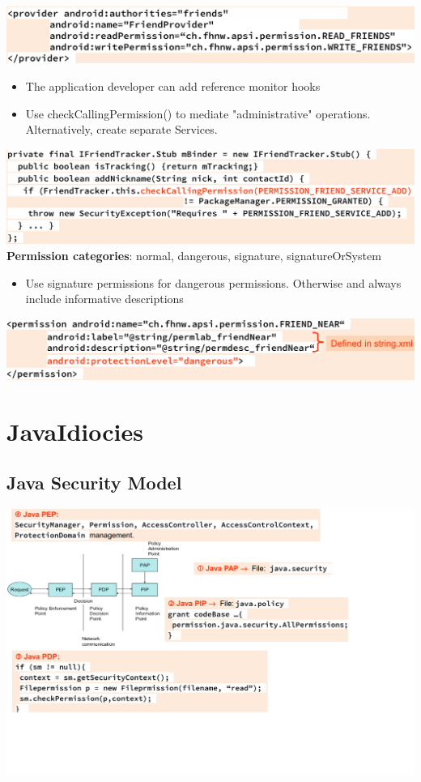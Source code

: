 \documentclass[10pt]{article}
\begin{document}
\includegraphics[scale=0.4]{content_prov_perm.png}
\begin{itemize}
	\item The application developer can add reference monitor hooks
	\item Use checkCallingPermission() to mediate "administrative" operations. Alternatively, create separate Services.
\end{itemize}
\includegraphics[scale=0.4]{service_hooks.png}
\textbf{Permission categories}: normal, dangerous, signature, signatureOrSystem
\begin{itemize}
	\item Use signature permissions for dangerous permissions. Otherwise and always include informative descriptions
\end{itemize}
\includegraphics[scale=0.4]{perm_categ.png}

\newpage
\section{JavaIdiocies}
\subsection{Java Security Model}
\includegraphics[scale=0.4]{java_sec_model.png}
\end{document}
